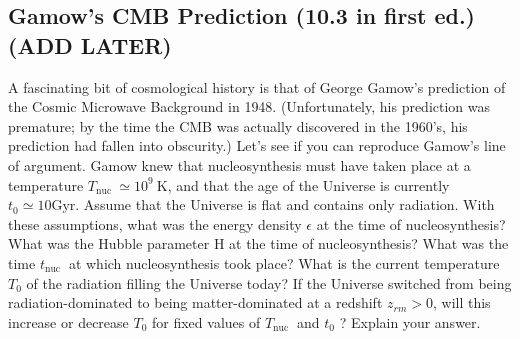 \subsection{}
\subsection*{Gamow's CMB Prediction (10.3 in first ed.) (ADD LATER)}
\begin{tcolorbox}
    A fascinating bit of cosmological history is that of George Gamow's prediction of the Cosmic Microwave Background in 1948. (Unfortunately, his prediction was premature; by the time the CMB was actually discovered in the 1960's, his prediction had fallen into obscurity.) Let's see if you can reproduce Gamow's line of argument. Gamow knew that nucleosynthesis must have taken place at a temperature $T_{\text {nuc }} \simeq 10^{9} \mathrm{~K}$, and that the age of the Universe is currently $t_{0} \simeq 10 \mathrm{Gyr}$. Assume that the Universe is flat and contains only radiation. With these assumptions, what was the energy density $\epsilon$ at the time of nucleosynthesis? What was the Hubble parameter $\mathrm{H}$ at the time of nucleosynthesis? What was the time $t_{\text {nuc }}$ at which nucleosynthesis took place? What is the current temperature $T_{0}$ of the radiation filling the Universe today? If the Universe switched from being radiation-dominated to being matter-dominated at a redshift $z_{r m}>0$, will this increase or decrease $T_{0}$ for fixed values of $T_{\text {nuc }}$ and $t_{0}$ ? Explain your answer.
\end{tcolorbox}